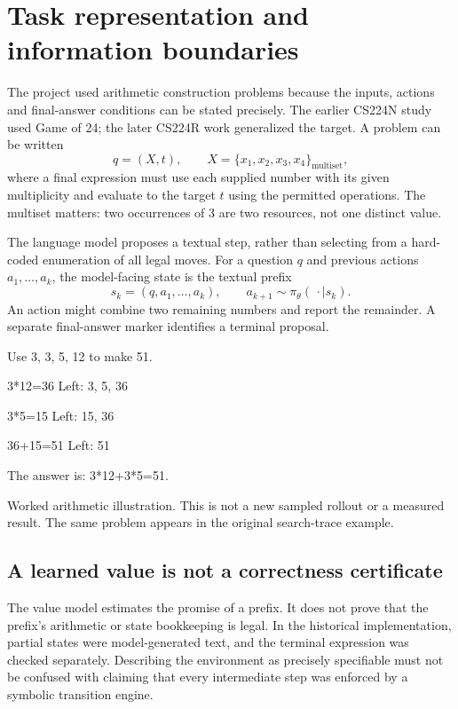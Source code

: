 \documentclass[11pt,letterpaper]{article}
\newcommand{\smallnote}[1]{{\small\color{ink}#1}}
\begin{document}
\section{Task representation and information boundaries}
The project used arithmetic construction problems because the inputs, actions and final-answer conditions can be stated precisely. The earlier CS224N study used Game of 24; the later CS224R work generalized the target. A problem can be written
\begin{equation}
q=(X,t),\qquad X=\{x_1,x_2,x_3,x_4\}_{\mathrm{multiset}},
\end{equation}
where a final expression must use each supplied number with its given multiplicity and evaluate to the target $t$ using the permitted operations. The multiset matters: two occurrences of $3$ are two resources, not one distinct value.

The language model proposes a textual step, rather than selecting from a hard-coded enumeration of all legal moves. For a question $q$ and previous actions $a_1,\ldots,a_k$, the model-facing state is the textual prefix
\begin{equation}
s_k=(q,a_1,\ldots,a_k),\qquad a_{k+1}\sim\pi_\theta(\,\cdot\mid s_k).
\end{equation}
An action might combine two remaining numbers and report the remainder. A separate final-answer marker identifies a terminal proposal.

\begin{center}
\begin{minipage}{0.94\linewidth}
\small\ttfamily
Use 3, 3, 5, 12 to make 51.\par
3*12=36 Left: 3, 5, 36\par
3*5=15 Left: 15, 36\par
36+15=51 Left: 51\par
The answer is: 3*12+3*5=51.
\end{minipage}
\end{center}
\smallnote{Worked arithmetic illustration. This is not a new sampled rollout or a measured result. The same problem appears in the original search-trace example.}

\subsection{A learned value is not a correctness certificate}
The value model estimates the promise of a prefix. It does not prove that the prefix's arithmetic or state bookkeeping is legal. In the historical implementation, partial states were model-generated text, and the terminal expression was checked separately. Describing the environment as precisely specifiable must not be confused with claiming that every intermediate step was enforced by a symbolic transition engine.
\end{document}
